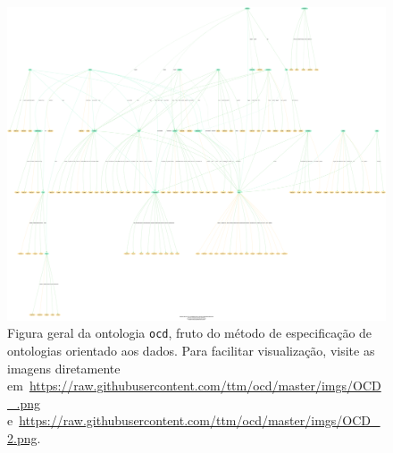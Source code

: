 \documentclass[12pt]{article}
\begin{document}
\begin{figure}[h!]
  \centering
    \includegraphics[width=\textwidth]{../figs/OCD_2.png}
  \caption{Figura geral da ontologia \texttt{ocd}, fruto do método de especificação de ontologias orientado aos dados. Para facilitar visualização, visite as imagens diretamente em~\url{https://raw.githubusercontent.com/ttm/ocd/master/imgs/OCD_.png} e~\url{https://raw.githubusercontent.com/ttm/ocd/master/imgs/OCD_2.png}.}\label{fig:ocdg}
\end{figure}
\end{document}
